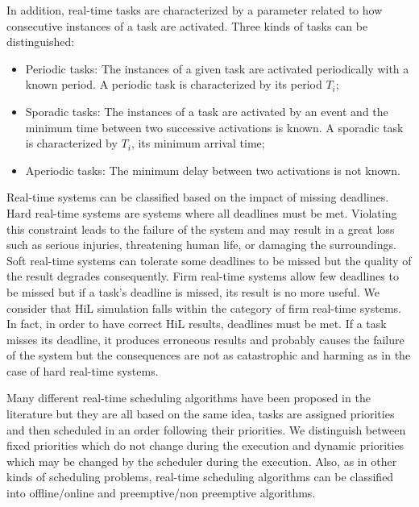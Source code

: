 In addition, real-time tasks are characterized by a parameter related to how consecutive instances of a task are activated. Three kinds of tasks can be distinguished:
\begin{itemize}
\item Periodic tasks: The instances of a given task are activated periodically with a known period. A periodic task is characterized by its period $T_i$;
\item Sporadic tasks: The instances of a task are activated by an event and the minimum time between two successive activations is known. A sporadic task is characterized by $T_i$, its minimum arrival time;
\item Aperiodic tasks: The minimum delay between two activations is not known.
\end{itemize} 


Real-time systems can be classified based on the impact of missing deadlines. Hard real-time systems are systems where all deadlines must be met. Violating this constraint leads to the failure of the system and may result in a great loss such as serious injuries, threatening human life, or damaging the surroundings. Soft real-time systems can tolerate some deadlines to be missed but the quality of the result degrades consequently. Firm real-time systems allow few deadlines to be missed but if a task's deadline is missed, its result is no more useful. We consider that HiL simulation falls within the category of firm real-time systems. In fact, in order to have correct HiL results, deadlines must be met. If a task misses its deadline, it produces erroneous results and probably causes the failure of the system but the consequences are not as catastrophic and harming as in the case of hard real-time systems.   

Many different real-time scheduling algorithms have been proposed in the literature but they are all based on the same idea, tasks are assigned priorities and then scheduled in an order following their priorities. We distinguish between fixed priorities which do not change during the execution and dynamic priorities which may be changed by the scheduler during the execution. Also, as in other kinds of scheduling problems, real-time scheduling algorithms can be classified into offline/online and preemptive/non preemptive algorithms.

